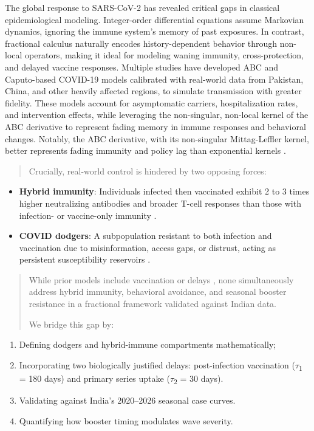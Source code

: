 \documentclass[10pt]{NSP1}
\begin{document}
The global response to SARS-CoV-2 has revealed critical gaps in classical epidemiological modeling. Integer-order differential equations assume Markovian dynamics, ignoring the immune system's memory of past exposures. In contrast, fractional calculus naturally encodes history-dependent behavior through non-local operators, making it ideal for modeling waning immunity, cross-protection, and delayed vaccine responses. Multiple studies have developed ABC and Caputo-based COVID-19 models calibrated with real-world data\cite{ref33,ref34,ref35,ref36,ref37,ref38,ref39,ref40,ref41,ref42,ref43} from Pakistan, China, and other heavily affected regions, to simulate transmission with greater fidelity.\cite{ref44} These models account for asymptomatic carriers, hospitalization rates, and intervention effects, while leveraging the non-singular, non-local kernel of the ABC derivative to represent fading memory in immune responses and behavioral changes. Notably, the ABC derivative, with its non-singular Mittag-Leffler kernel, better represents fading immunity and policy lag than exponential kernels \cite{ref45}.

\begin{quote}
Crucially, real-world control is hindered by two opposing forces:
\end{quote}

\begin{itemize}
\item
  \textbf{Hybrid immunity}: Individuals infected then vaccinated exhibit 2 to 3 times higher neutralizing antibodies and broader T-cell responses than those with infection- or vaccine-only immunity \cite{ref46,ref47,ref48}.
\item
  \textbf{COVID dodgers}: A subpopulation resistant to both infection and vaccination due to misinformation, access gaps, or distrust, acting as persistent susceptibility reservoirs \cite{ref49,ref50}.
\end{itemize}

\begin{quote}
While prior models include vaccination or delays \cite{ref49,ref50}, none simultaneously address hybrid immunity, behavioral avoidance, and seasonal booster resistance in a fractional framework validated against Indian data.

We bridge this gap by:
\end{quote}

\begin{enumerate}
\def\labelenumi{\arabic{enumi}.}
\item
 Defining dodgers and hybrid-immune compartments mathematically;
\item
  Incorporating two biologically justified delays: post-infection vaccination (\emph{$\tau$}\textsubscript{1} = 180 days) and primary series uptake (\emph{$\tau$}\textsubscript{2} = 30 days).
\item
  Validating against India's 2020--2026 seasonal case curves.
\item
  Quantifying how booster timing modulates wave severity.
\end{enumerate}
\end{document}
